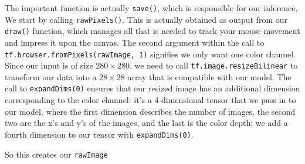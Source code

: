 \documentclass[12pt]{article}
\begin{document}
The important function is actually \texttt{save()}, which is responsible for our inference. We start by calling \texttt{rawPixels()}. This is actually obtained as output from our \texttt{draw()} function,
which manages all that is needed to track your mouse movement and impress it upon the canvas. 
The second argument within the call to \texttt{tf.browser.fromPixels(rawImage, 1)} signifies we only want one color channel. Since our input is of size $280 \times 280$, we need to call \texttt{tf.image.resizeBilinear} to transform our data into a $28 \times 28$ array that is compatible with our model. The call to \texttt{expandDims(0)} ensures that our resized image has an additional dimension corresponding to the color channel: it's a 4-dimensional tensor that we pass in to our model, where the first dimension describes the number of images, the second two are the x's and y's of the images, and the last is the color depth; we add a fourth dimension to our tensor with \texttt{expandDims(0)}. 


So this creates our \texttt{rawImage}
\end{document}
